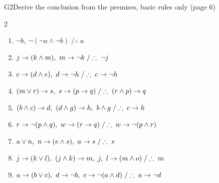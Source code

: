 \begin{nbexercise}{G2}{Derive the conclusion from the premises, basic rules only (page 6)}
\begin{multicols}{2}\small
\begin{enumerate}[nosep]
  \item $\neg b,\ \neg(\neg a \land \neg b) \;/\therefore\; a$
  \item $j \rightarrow (k \land m),\ m \rightarrow \neg k \;/\therefore\; \neg j$
  \item $c \rightarrow (d \land e),\ d \rightarrow \neg h \;/\therefore\; c \rightarrow \neg h$
  \item $(m \lor r) \rightarrow s,\ s \rightarrow (p \rightarrow q) \;/\therefore\; (r \land p) \rightarrow q$
  \item $(b \land c) \rightarrow d,\ (d \land g) \rightarrow h,\ b \land g \;/\therefore\; c \rightarrow h$
  \item $r \rightarrow \neg(p \land q),\ w \rightarrow (r \rightarrow q) \;/\therefore\; w \rightarrow \neg(p \land r)$
  \item $a \lor n,\ n \rightarrow (e \land s),\ a \rightarrow s \;/\therefore\; s$
  \item $j \rightarrow (k \lor l),\ (j \land k) \rightarrow m,\ j,\ l \rightarrow (m \land o) \;/\therefore\; m$
  \item $a \limp (b \lor c),\ d \limp \neg b,\ c \limp \neg(a \land d) \;/\therefore\; a \limp \neg d$
\end{enumerate}
\end{multicols}
\end{nbexercise}
